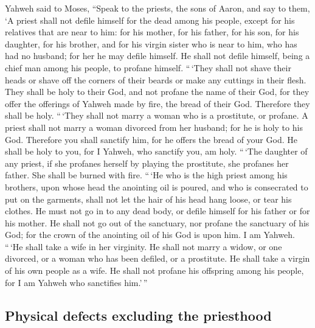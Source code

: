  Yahweh said to Moses, ``Speak to the priests, the sons of
Aaron, and say to them, `A priest shall not defile himself for the dead
among his people,  except for his relatives that are near
to him: for his mother, for his father, for his son, for his daughter,
for his brother,  and for his virgin sister who is near to
him, who has had no husband; for her he may defile himself.
 He shall not defile himself, being a chief man among his
people, to profane himself.  ``\,`They shall not shave
their heads or shave off the corners of their beards or make any
cuttings in their flesh.  They shall be holy to their God,
and not profane the name of their God, for they offer the offerings of
Yahweh made by fire, the bread of their God. Therefore they shall be
holy.  ``\,`They shall not marry a woman who is a
prostitute, or profane. A priest shall not marry a woman divorced from
her husband; for he is holy to his God.  Therefore you
shall sanctify him, for he offers the bread of your God. He shall be
holy to you, for I Yahweh, who sanctify you, am holy. 
``\,`The daughter of any priest, if she profanes herself by playing the
prostitute, she profanes her father. She shall be burned with fire.
 ``\,`He who is the high priest among his brothers, upon
whose head the anointing oil is poured, and who is consecrated to put on
the garments, shall not let the hair of his head hang loose, or tear his
clothes.  He must not go in to any dead body, or defile
himself for his father or for his mother.  He shall not
go out of the sanctuary, nor profane the sanctuary of his God; for the
crown of the anointing oil of his God is upon him. I am Yahweh.
 ``\,`He shall take a wife in her virginity.
 He shall not marry a widow, or one divorced, or a woman
who has been defiled, or a prostitute. He shall take a virgin of his own
people as a wife.  He shall not profane his offspring
among his people, for I am Yahweh who sanctifies him.'\,''

\hypertarget{physical-defects-excluding-the-priesthood}{%
\subsection{Physical defects excluding the
priesthood}\label{physical-defects-excluding-the-priesthood}}

